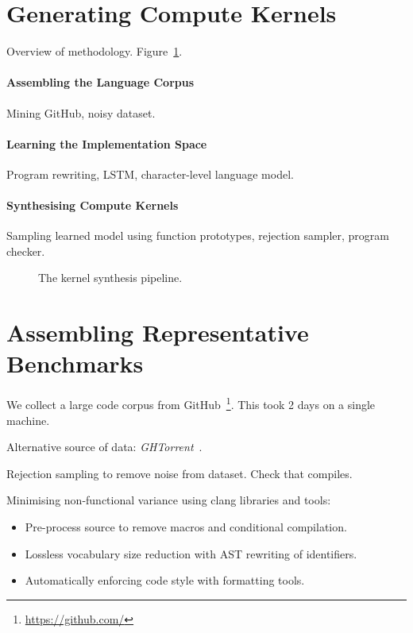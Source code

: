 \documentclass[preprint,nonatbib,10pt,nocopyrightspace]{sigplanconf}
\begin{document}
\section{Generating Compute Kernels}\label{sec:}

Overview of methodology. Figure~\ref{fig:structure}.

\paragraph{Assembling the Language Corpus} Mining GitHub, noisy
dataset.


\paragraph{Learning the Implementation Space} Program rewriting, LSTM,
character-level language model.


\paragraph{Synthesising Compute Kernels} Sampling learned model using
function prototypes, rejection sampler, program checker.


\begin{figure}[t]
  \centering
  
  \caption{%
    The kernel synthesis pipeline.%
  }
\label{fig:structure}
\end{figure}


\section{Assembling Representative Benchmarks}\label{sec:}

We collect a large code corpus from
GitHub~\footnote{\url{https://github.com/}}. This took 2 days on a
single machine.

Alternative source of data: \emph{GHTorrent}~\cite{Gousios2014a}.

Rejection sampling to remove noise from dataset. Check that compiles.

Minimising non-functional variance using clang libraries and tools:
\begin{itemize}
\item Pre-process source to remove macros and conditional
  compilation.
\item Lossless vocabulary size reduction with AST rewriting of
  identifiers.
\item Automatically enforcing code style with formatting tools.
\end{itemize}
\end{document}
